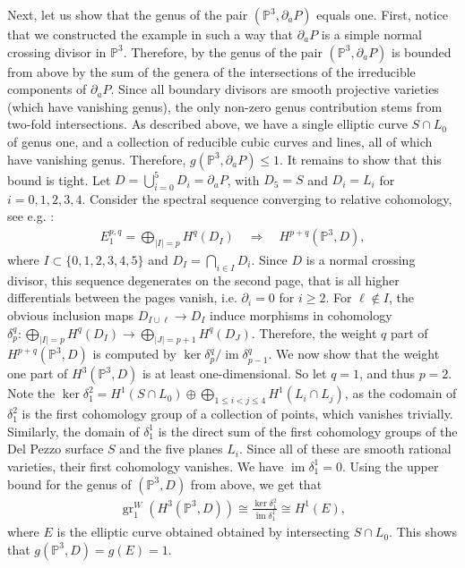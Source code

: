 \documentclass[12pt]{extarticle}
\theoremstyle{definition}
\theoremstyle{theorem}
\theoremstyle{remark}
\numberwithin{equation}{section}
\newcommand{\PP}{\mathbb{P}}
\newcommand{\im}{\operatorname{im}}
\begin{document}
Next, let us show that the genus of the pair $(\PP^3,\partial_a P)$ equals one.
First, notice that we constructed the example in such a way that $\partial_a P$ is a simple normal crossing divisor in $\PP^3$.
Therefore, by \cite[Corollary 3.14]{brown-dupont} the genus of the pair $(\PP^3,\partial_a P)$ is bounded from above by the sum of the genera of the intersections of the irreducible components of $\partial_a P$.
Since all boundary divisors are smooth projective varieties (which have vanishing genus), the only non-zero genus contribution stems from two-fold intersections. 
As described above, we have a single elliptic curve $S\cap L_0$ of genus one, and a collection of reducible cubic curves and lines, all of which have vanishing genus.
Therefore, $g(\PP^3,\partial_a P)\leq 1$.
It remains to show that this bound is tight.
Let $D=\bigcup_{i=0}^5D_i=\partial_aP$, with $D_5=S$ and $D_i=L_i$ for $i=0,1,2,3,4$.
Consider the spectral sequence converging to relative cohomology, see e.g. \cite[Equation (12)]{brown-dupont}:
\begin{align}\label{eq:spectral_sequence}
    E^{p,q}_1 = \bigoplus_{|I|=p}H^q(D_I) \quad \Longrightarrow\quad H^{p+q}(\PP^3,D),
\end{align}
where $I\subset \{0,1,2,3,4,5\}$ and $D_I=\bigcap_{i\in I}D_i$. Since $D$ is a normal crossing divisor, this sequence degenerates on the second page, that is all higher differentials between the pages vanish, i.e. $\partial_i=0$ for $i\geq 2$.
For $\ell\notin I$, the obvious inclusion maps $D_{I\cup \ell}\rightarrow D_I$ induce morphisms in cohomology $\delta^q_p:\bigoplus_{|I|=p}H^q(D_I)\rightarrow \bigoplus_{|J|=p+1}H^q(D_J)$.
Therefore, the weight $q$ part of $H^{p+q}(\PP^3,D)$ is computed by $\ker \delta^q_p/\im \delta^q_{p-1}$.
We now show that the weight one part of $H^3(\PP^3,D)$ is at least one-dimensional. So let $q=1$, and thus $p=2$.
Note the $\ker \delta_1^2=H^1(S\cap L_0)\oplus \bigoplus_{1\leq i<j \leq 4}H^1(L_i\cap L_j)$, as the codomain of $\delta_1^2$ is the first cohomology group of a collection of points, which vanishes trivially.
Similarly, the domain of $\delta^1_1$ is the direct sum of the first cohomology groups of the Del Pezzo surface $S$ and the five planes $L_i$.
Since all of these are smooth rational varieties, their first cohomology vanishes. 
We have $\im \delta^1_1=0$.
Using the upper bound for the genus of $(\PP^3,D)$ from above, we get that
\begin{align}\label{eq:weight_one_part}
\operatorname{gr}^W_1(H^3(\PP^3,D))\cong \frac{\ker \delta^2_1}{\im \delta^1_1}\cong H^1(E),
\end{align}
where $E$ is the elliptic curve obtained obtained by intersecting $S\cap L_0$.
This shows that $g(\PP^3,D)=g(E)=1$.
\end{document}
